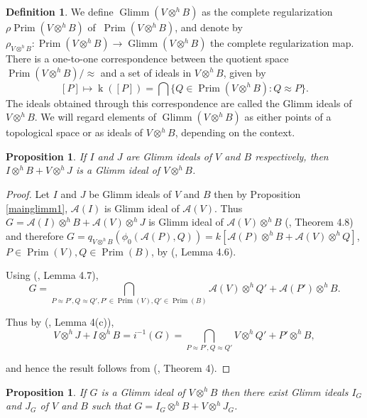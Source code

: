 \documentclass{birkjour}
\newtheorem{prop}[thm]{Proposition}
\theoremstyle{definition}
\newtheorem{defn}[thm]{Definition}
\theoremstyle{remark}
\numberwithin{equation}{section}
\begin{document}
\begin{defn}
 We define $\operatorname{Glimm}(V \otimes^h B)$ as the complete regularization $\rho \operatorname{Prim}(V \otimes^h B)$ of $\ \operatorname{Prim}(V\otimes^h B)$, and denote by $\rho_{V\otimes^h B}: \operatorname{Prim}(V \otimes^h B) \to \operatorname{Glimm}(V \otimes^h B)$ the complete regularization map. There is  a one-to-one correspondence between the quotient space \(\operatorname{Prim}(V \otimes^h B) / \approx\) and a set of ideals in \(V \otimes^h B\), given by 
\[
[P] \mapsto \operatorname{k}([P]) = \bigcap \{ Q \in \operatorname{Prim}(V \otimes^h B) : Q \approx P \}.
\]
The ideals obtained through this correspondence are called the Glimm ideals of $V \otimes^h B$.  We will regard elements of $\operatorname{Glimm}(V \otimes^h B)$ as either points of a topological space or as ideals of $V \otimes^h B$, depending on the context.

\end{defn}





 
\begin{prop}\label{glimmmain1}
    If $I$ and $J$ are Glimm ideals of $V$ and $B$ respectively, then $I \otimes^h B+ V \otimes^h J$ is a Glimm ideal of $V \otimes^h B$.
\end{prop}
    


\begin{proof}
Let $I$ and $J$ be Glimm ideals of $V$ and $B$ then by  Proposition \ref{mainglimm1}, $\mathcal{A}(I)$
is Glimm ideal of $\mathcal{A}(V)$. Thus  $G=\mathcal{A}(I)\otimes^h B+ \mathcal{A}(V) \otimes^h J$ is Glimm ideal of  $\mathcal{A}(V) \otimes^h B$ (\cite{AR}, Theorem 4.8) and therefore   $G=q_{V \otimes^h B}(\phi_0(\mathcal{A}(P),Q))= k[\mathcal{A}(P)\otimes^h B+ \mathcal{A}(V) \otimes^h Q]$, $P\in  \operatorname{Prim}(V), Q \in \operatorname{Prim}(B)$, by (\cite{AR}, Lemma 4.6).

Using (\cite{AR}, Lemma 4.7), \[G=\bigcap_{
P \approx P', Q\approx Q', P'\in \operatorname{Prim}(V), Q'\in \operatorname{Prim}(B)} \mathcal{A}(V) \otimes^h Q' + \mathcal{A}(P') \otimes^h B.\]



Thus by (\cite{AA}, Lemma 4(c)),
\[
V \otimes^h J + I \otimes^h B = i^{-1}(G)
=\bigcap_{
P \approx P', Q\approx Q'} V \otimes^h Q' + P' \otimes^h B,
\]

and hence the result follows from (\cite{AA}, Theorem 4).

\end{proof}
\begin{prop}\label{glimmmmain1}
     If $G$ is a Glimm ideal of $V \otimes^h B$ then there exist Glimm ideals $I_G$ and $J_G$ of $V$ and $B$ such that $G=I_G \otimes^h B+ V \otimes^h J_G$.
\end{prop}
\end{document}
